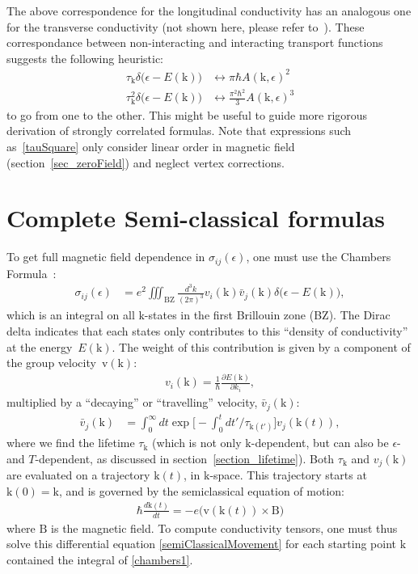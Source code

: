 \documentclass[notitlepage,11pt,nofootinbib]{revtex4-1}
\renewcommand{\vec}[1]{\bm{\mathrm{#1}}}
\begin{document}
The above correspondence for the longitudinal conductivity has an analogous one for the transverse conductivity (not shown here, please refer to~\cite{verret_phenomenological_2017}). These correspondance between non-interacting and interacting transport functions suggests the following heuristic:
\begin{align}
\tau_{\vec k}\delta\big(\epsilon-E(\vec k)\big) &\longleftrightarrow \pi\hbar A(\vec k,\epsilon)^2
\\
\tau_{\vec k}^2\delta\big(\epsilon-E(\vec k)\big) &\longleftrightarrow \frac{\pi^2\hbar^2}{3} A(\vec k,\epsilon)^3
\label{tauSquare}
\end{align}
to go from one to the other. This might be useful to guide more rigorous derivation of strongly correlated formulas. Note that expressions such as~\eqref{tauSquare} only consider linear order in magnetic field (section~\ref{sec_zeroField}) and neglect vertex corrections.

\section{Complete Semi-classical formulas}
\noindent
To get full magnetic field dependence in $\sigma_{ij}(\epsilon)$, one must use the Chambers Formula~\cite{ashcroft_solid_1976}:
\begin{align}
\sigma_{ij}(\epsilon) 
&=
e^2\iiint_{\text{BZ}}\frac{d^3k}{(2\pi)^3}
v_{i}(\vec k)\bar{v}_{j}(\vec k)
\delta\big(\epsilon-E(\vec k)\big),
\label{chambers1}
\end{align}
which is an integral on all $\vec k$-states in the first Brillouin zone (BZ). The Dirac delta indicates that each states only contributes to this ``density of conductivity'' at the energy~$E(\vec k)$. The weight of this contribution is given by a component of the group velocity~$\vec v(\vec k)$:
\begin{align}
v_{i}(\vec k) = \frac{1}{\hbar}\frac{\partial E(\vec k)}{\partial k_i},
\label{velocity}
\end{align}
multiplied by a ``decaying'' or ``travelling'' velocity, $\bar{v}_{j}(\vec k)$:
\begin{align}
\bar{v}_{j}(\vec k)
&=
\int_{0}^{\infty}dt
\exp\Big[
-\int_{0}^{t}dt'/\tau_{\vec k(t')}
\Big]
v_{j}(\vec k(t)),
\label{chambers2}
\end{align}
where we find the lifetime $\tau_{\vec k}$ (which is not only $\vec k$-dependent, but can also be $\epsilon$- and $T$-dependent, as discussed in section~\ref{section_lifetime}). Both $\tau_{\vec k}$ and $v_j(\vec k)$ are evaluated on a trajectory $\vec k(t)$, in $\vec k$-space. This trajectory starts at $\vec k(0)=\vec k$, and is governed by the semiclassical equation of motion:
\begin{align}
\hbar\frac{d\vec k(t)}{dt} =
-e \big(\vec v(\vec k(t))\times\vec B \big)
\label{semiClassicalMovement}
\end{align}
where $\vec B$ is the magnetic field. To compute conductivity tensors, one must thus solve this differential equation \eqref{semiClassicalMovement} for each starting point $\vec k$ contained the integral of \eqref{chambers1}.
\end{document}
